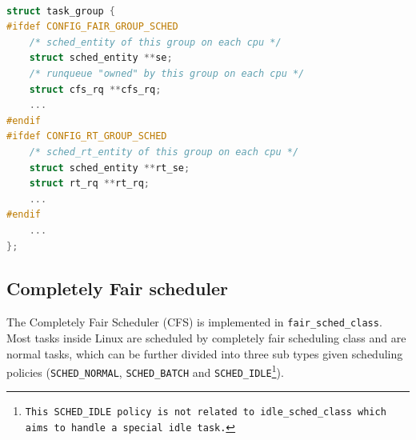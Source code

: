 \begin{lstlisting}[language=C,
caption={Specific runqueue information within a task group},
			label={lst:task_group_ex}]		

struct task_group {
#ifdef CONFIG_FAIR_GROUP_SCHED
	/* sched_entity of this group on each cpu */
	struct sched_entity **se;
	/* runqueue "owned" by this group on each cpu */
	struct cfs_rq **cfs_rq;
	...
#endif
#ifdef CONFIG_RT_GROUP_SCHED
	/* sched_rt_entity of this group on each cpu */
	struct sched_entity **rt_se;
	struct rt_rq **rt_rq;
	...
#endif
	...
};
\end{lstlisting}

\subsection{Completely Fair scheduler\label{sec:LinuxSched_cfs}}

The Completely Fair Scheduler (CFS) is implemented in
\texttt{fair\_sched\_class}.  Most tasks inside Linux are scheduled by
completely fair scheduling class and are normal tasks, which can be
further divided into three sub types given scheduling policies
(\texttt{SCHED\_NORMAL}, \texttt{SCHED\_BATCH} and
\texttt{SCHED\_IDLE\footnote{This SCHED\_IDLE policy is not related to
    idle\_sched\_class which aims to handle a special idle task.}}).

